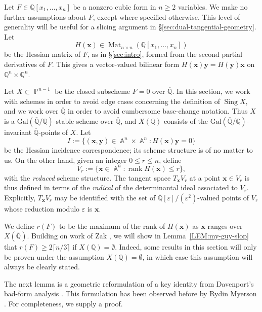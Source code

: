 \documentclass[a4paper,11pt, twoside,reqno]{amsart}
\theoremstyle{plain}
\theoremstyle{definition}
\theoremstyle{remark}
\newcommand{\Gal}{\mathrm{Gal}}
\newcommand{\bfx}{\bm{x}}
\newcommand{\QQ}{\mathbb{Q}}
\DeclareMathOperator{\sing}{Sing}
\DeclareMathOperator{\rank}{rank}
\DeclareMathOperator{\A}{\mathbb{A}}
\DeclareMathOperator{\PP}{\mathbb{P}}
\DeclareMathOperator{\Mat}{Mat}
\newcommand{\ve}{\varepsilon}
\renewcommand{\leq}{\leqslant}
\renewcommand{\ge}{\geqslant}
\newcommand{\Qbar}{\overline{\mathbb{Q}}}
\numberwithin{equation}{section}
\begin{document}
Let $F\in \QQ[x_1,\dots,x_n]$ be a nonzero cubic form in $n\ge 2$ variables.
We make no further assumptions about $F$,
except where specified otherwise.
This level of generality will be useful for
a slicing argument in \S\ref{sec:dual-tangential-geometry}.
Let $$H(\bm{x})\in \Mat_{n\times n}(\QQ[x_1,\dots, x_n])$$
be the Hessian matrix of $F$,
as in \S\ref{sec:intro},
formed from the second partial derivatives of $F$.
This gives a vector-valued bilinear form
$H(\bm{x})\bm{y}=H(\bm{y})\bm{x}$ on $\QQ^n\times \QQ^n$.

Let $X\subset \PP^{n-1}$ be the closed subscheme $F=0$ over $\Qbar$.
In this section, we work with schemes
in order to avoid edge cases concerning the definition of $\sing X$,
and we work over $\Qbar$
in order to avoid cumbersome base-change notation.
Thus $X$ is a $\Gal(\Qbar/\QQ)$-stable scheme over $\Qbar$,
and $X(\QQ)$ consists of the $\Gal(\Qbar/\QQ)$-invariant $\Qbar$-points of $X$.
Let
\begin{equation}
\label{Eq: Def.hessian.Incidence}
I := \{(\bm{x},\bm{y})\in \A^n\times \A^n\colon H(\bm{x})\bm{y}=0\}
\end{equation}
be the Hessian incidence correspondence;
its scheme structure is of no matter to us.
On the other hand, given an integer $0\leq r \leq n$, define
\begin{equation}
\label{EQ:Hessian-Vr-locus}
V_r := \{\bm{x}\in \A^n\colon \rank H(\bm{x})\leq r\},
\end{equation}
with the \emph{reduced} scheme structure.
The tangent space $T_{\bfx}V_r$ at a point $\bfx\in V_r$ is thus defined
in terms of the \emph{radical} of the determinantal ideal associated to $V_r$.
Explicitly, $T_{\bfx}V_r$ may be identified with the set of $\Qbar[\ve]/(\ve^2)$-valued
points of $V_r$
whose reduction modulo $\ve$ is $\bfx$.

We define $r(F)$ to be the maximum of the rank of $H(\bm{x})$ as $\bm{x}$ ranges over $X(\Qbar)$. 
Building on work of Zak \cite{myguyzak},
we will show in Lemma~\ref{LEM:my-guy-slop} that $r(F) \ge 2\lceil n/3\rceil$
if $X(\QQ)=\emptyset$.
Indeed, some results in this section will only be proven
under the assumption $X(\QQ)=\emptyset$,
in which case this assumption will always be clearly stated.


The next lemma is a geometric reformulation of a key identity
\cite[\S3, equation~(3.3)]{BDE12}
from Davenport's bad-form analysis \cite[proof of Lemma~3]{Dav63}.
This formulation has been observed before by
Rydin Myerson \cite[\S1.4]{RM19}.
For completeness, we supply a proof.
\end{document}
